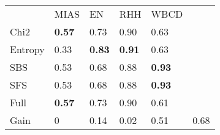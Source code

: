 \begin{tabular}{|l|l|l|l|l|l}
\cline{1-5}
        & MIAS              & EN                & RHH               & WBCD      &         \\
\cline{1-5}
Chi2    & \textbf{0.57}  & 0.73           & 0.90           & 0.63           &         \\
Entropy & 0.33           & \textbf{0.83}  & \textbf{0.91}  & 0.63           &         \\
SBS     & 0.53           & 0.68           & 0.88           & \textbf{0.93}  &         \\
SFS     & 0.53           & 0.68           & 0.88           & \textbf{0.93}  &         \\
Full    & \textbf{0.57}  & 0.73           & 0.90           & 0.61           &         \\
\cline{1-5}
\cline{1-5}
Gain    & 0                 & 0.14           & 0.02           & 0.51           & 0.68 \\
\cline{1-5}
\end{tabular}
